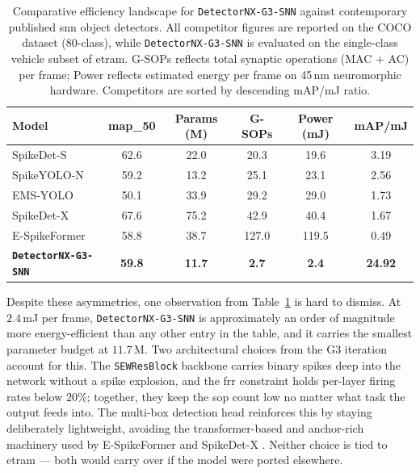 \begin{table}[htbp]
\centering
\begin{tabular}{|l|c|c|c|c|c|}
\hline
\textbf{Model} & \textbf{\gls{map_50}} & \textbf{Params (M)} & \textbf{G-SOPs} & \textbf{Power (mJ)} & \textbf{mAP/mJ} \\
\hline
SpikeDet-S \cite{fan2025spikedet}        & 62.6 & 22.0 & 20.3  & 19.6  & 3.19  \\
SpikeYOLO-N \cite{spike_yolo}      & 59.2 & 13.2 & 25.1  & 23.1  & 2.56  \\
EMS-YOLO \cite{ems_yolo}          & 50.1 & 33.9 & 29.2  & 29.0  & 1.73  \\
SpikeDet-X \cite{fan2025spikedet}        & 67.6 & 75.2 & 42.9  & 40.4  & 1.67  \\
E-SpikeFormer \cite{espikeformer} & 58.8 & 38.7 & 127.0 & 119.5 & 0.49  \\
\hline
\textbf{\texttt{DetectorNX-G3-SNN}} & \textbf{59.8} & \textbf{11.7} & \textbf{2.7} & \textbf{2.4} & \textbf{24.92} \\
\hline
\end{tabular}
\caption[Comparative efficiency landscape of related SNN detectors.]{Comparative efficiency landscape for \texttt{DetectorNX-G3-SNN} against contemporary published \gls{snn} object detectors. All competitor figures are reported on the COCO dataset (80-class), while \texttt{DetectorNX-G3-SNN} is evaluated on the single-class vehicle subset of \gls{etram}. G-SOPs reflects total synaptic operations (MAC + AC) per frame; Power reflects estimated energy per frame on 45\,nm neuromorphic hardware. Competitors are sorted by descending mAP/mJ ratio.}
\label{tab:efficiency_landscape}
\end{table}

Despite these asymmetries, one observation from Table~\ref{tab:efficiency_landscape} is hard to dismiss. At $2.4$\,mJ per frame, \texttt{DetectorNX-G3-SNN} is approximately an order of magnitude more energy-efficient than any other entry in the table, and it carries the smallest parameter budget at $11.7$\,M. 
Two architectural choices from the G3 iteration account for this. The \texttt{SEWResBlock} backbone carries binary spikes deep into the network without a spike explosion, and the \gls{frr} constraint holds per-layer firing rates below $20\%$; together, they keep the \gls{sop} count low no matter what task the output feeds into. 
The multi-box detection head reinforces this by staying deliberately lightweight, avoiding the transformer-based and anchor-rich machinery used by E-SpikeFormer and SpikeDet-X \cite{espikeformer, fan2025spikedet}. 
Neither choice is tied to \gls{etram} --- both would carry over if the model were ported elsewhere.

